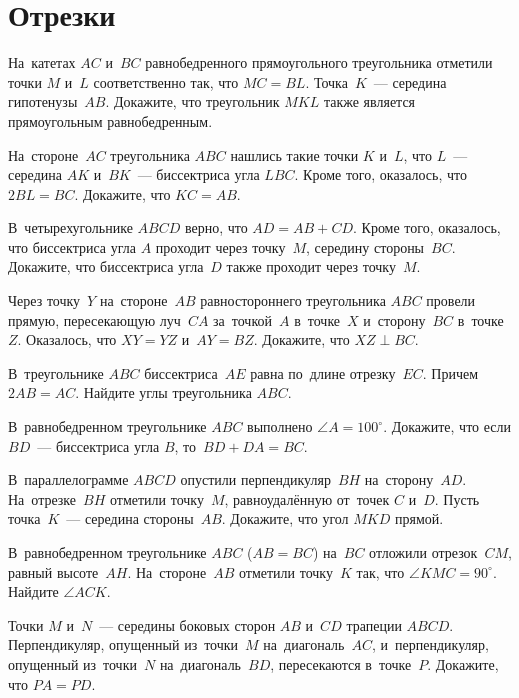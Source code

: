 
\section*{Отрезки}


\begin{problems}

\item
На~катетах $AC$ и~$BC$ равнобедренного прямоугольного треугольника отметили
точки $M$ и~$L$ соответственно так, что $MC = BL$.
Точка~$K$~--- середина гипотенузы~$AB$.
Докажите, что треугольник $MKL$ также является прямоугольным равнобедренным.

\item
На~стороне~$AC$ треугольника $ABC$ нашлись такие точки $K$ и~$L$, что
$L$~--- середина $AK$ и~$BK$~--- биссектриса угла $LBC$.
Кроме того, оказалось, что $2 BL = BC$.
Докажите, что $KC = AB$.

\item
В~четырехугольнике $ABCD$ верно, что $AD = AB + CD$.
Кроме того, оказалось, что биссектриса угла $A$ проходит через точку~$M$,
середину стороны~$BC$.
Докажите, что биссектриса угла~$D$ также проходит через точку~$M$.

\item
Через точку~$Y$ на~стороне~$AB$ равностороннего треугольника $ABC$ провели
прямую, пересекающую луч~$CA$ за~точкой~$A$ в~точке~$X$ и~сторону~$BC$
в~точке~$Z$.
Оказалось, что $XY = YZ$
и~$AY = BZ$.
Докажите, что $XZ \perp BC$.

\item
В~треугольнике $ABC$ биссектриса~$AE$ равна по~длине отрезку~$EC$.
Причем $2 AB = AC$.
Найдите углы треугольника $ABC$.

\item
В~равнобедренном треугольнике $ABC$ выполнено $\angle A = 100^{\circ}$.
Докажите, что если $BD$~--- биссектриса угла $B$, то~$BD + DA = BC$.

\item
В~параллелограмме $ABCD$ опустили перпендикуляр~$BH$ на~сторону~$AD$.
На~отрезке~$BH$ отметили точку~$M$, равноудалённую от~точек $C$ и~$D$.
Пусть точка~$K$~--- середина стороны~$AB$.
Докажите, что угол $MKD$ прямой.

\item
В~равнобедренном треугольнике $ABC$ ($AB = BC$) на~$BC$ отложили отрезок~$CM$,
равный высоте~$AH$.
На~стороне~$AB$ отметили точку~$K$ так, что $\angle KMC = 90^{\circ}$.
Найдите $\angle ACK$.

\item
Точки $M$ и~$N$~--- середины боковых сторон $AB$ и~$CD$ трапеции $ABCD$.
Перпендикуляр, опущенный из~точки~$M$ на~диагональ~$AC$, и~перпендикуляр,
опущенный из~точки~$N$ на~диагональ~$BD$, пересекаются в~точке~$P$.
Докажите, что $PA = PD$.

\end{problems}

